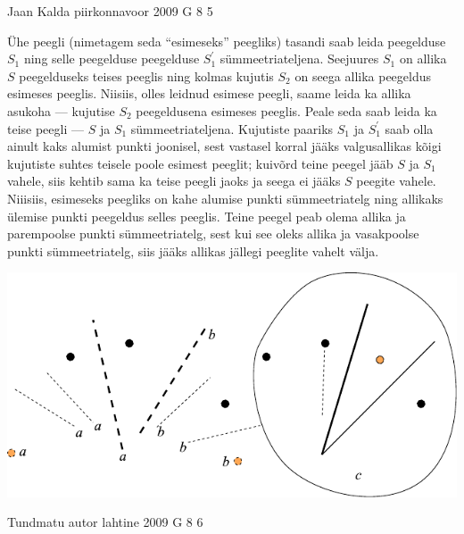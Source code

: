 \documentclass[11pt]{article}
\begin{document}
{%
{Jaan Kalda} %
{piirkonnavoor} %
{2009} %
{G 8} %
{5} %
{

\ifSolution
Ühe peegli (nimetagem seda \enquote{esimeseks} peegliks) tasandi saab leida peegelduse $S_1$ ning selle peegelduse peegelduse $S_1^\prime$ sümmeetriateljena.
Seejuures $S_1$ on allika $S$ peegelduseks teises peeglis ning kolmas kujutis $S_2$ on seega allika peegeldus esimeses peeglis. Niisiis, olles leidnud esimese peegli, saame
leida ka allika asukoha --- kujutise $S_2$ peegeldusena esimeses peeglis. Peale seda saab leida ka teise peegli --- $S$ ja $S_1$ sümmeetriateljena.
Kujutiste paariks $S_1$ ja $S_1^\prime$ saab olla ainult kaks alumist punkti joonisel, sest vastasel korral jääks valgusallikas kõigi kujutiste suhtes teisele poole esimest peeglit;
kuivõrd teine peegel jääb $S$ ja $S_1$ vahele, siis kehtib sama ka teise peegli jaoks ja seega ei jääks $S$ peegite vahele. Niiisiis, esimeseks peegliks on kahe alumise punkti sümmeetriatelg ning allikaks ülemise punkti peegeldus selles peeglis. Teine peegel peab olema allika ja parempoolse punkti sümmeetriatelg, sest kui see oleks allika ja vasakpoolse punkti sümmeetriatelg, siis jääks allikas jällegi peeglite vahelt välja.\\

\begin{center}
	\includegraphics[width=0.97\linewidth]{2009-v2g-08-lah}
\end{center}
\fi
}

{Tundmatu autor} %
{lahtine} %
{2009} %
{G 8} %
{6} %
{

}}
\end{document}
